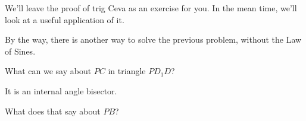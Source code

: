 We'll leave the proof of trig Ceva as an exercise for you. In the mean time, we'll look at a useful application of it.

By the way, there is another way to solve the previous problem, without the Law of Sines.

What can we say about $PC$ in triangle $PD_1D$?












It is an internal angle bisector.

What does that say about $PB$?






